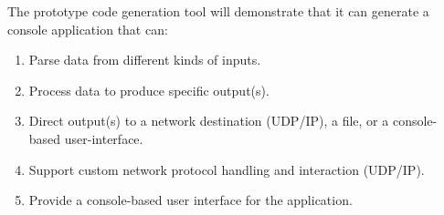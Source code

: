 \indent
The prototype code generation tool will demonstrate that it can generate a console application that can:
\begin{enumerate}
  \item Parse data from different kinds of inputs.
  \item Process data to produce specific output(s).
  \item Direct output(s) to a network destination (UDP/IP), a file, or a console-based user-interface.
  \item Support custom network protocol handling and interaction (UDP/IP).
  \item Provide a console-based user interface for the application. 
\end{enumerate}
